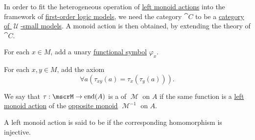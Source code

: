 \begin{remark}\label{rem:theory_of_left_monoid_actions}
  In order to fit the heterogeneous operation of \hyperref[def:left_monoid_action]{left monoid actions} into the framework of \hyperref[def:first_order_semantics/satisfiability]{first-order logic models}, we need the category \( \cat{C} \) to be a \hyperref[def:category_of_small_first_order_models]{category of \( \mscrU \)-small models}. A monoid action is then obtained, by extending the theory of \( \cat{C} \).

  \begin{thmenum}
     For each \( x \in M \), add a unary \hyperref[def:first_order_language/func]{functional symbol} \( \varphi_x \).

     For each \( x, y \in M \), add the axiom
    \begin{equation}\label{eq:rem:theory_of_left_monoid_actions/axiom_schema}
      \forall a (\tau_{xy}(a) = \tau_x(\tau_y(a))).
    \end{equation}
  \end{thmenum}
\end{remark}

\begin{definition}\label{def:right_monoid_action}
  We say that \( \tau: \mscrM \to \End(A) \) is a  of \( \mscrM \) on \( A \) if the same function is a \hyperref[def:left_monoid_action]{left monoid action} of the \hyperref[def:magma/opposite]{opposite monoid} \( \mscrM^{-1} \) on \( A \).
\end{definition}

\begin{definition}\label{def:faithful_left_monoid_action}
  A left monoid action is said to be  if the corresponding homomorphism is injective.
\end{definition}

